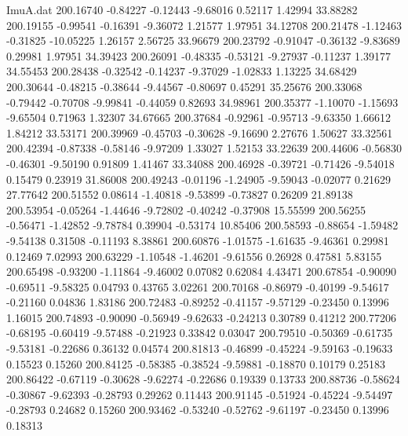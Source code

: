 \begin{filecontents}{ImuA.dat}
 200.16740   -0.84227   -0.12443   -9.68016    0.52117    1.42994   33.88282
 200.19155   -0.99541   -0.16391   -9.36072    1.21577    1.97951   34.12708
 200.21478   -1.12463   -0.31825  -10.05225    1.26157    2.56725   33.96679
 200.23792   -0.91047   -0.36132   -9.83689    0.29981    1.97951   34.39423
 200.26091   -0.48335   -0.53121   -9.27937   -0.11237    1.39177   34.55453
 200.28438   -0.32542   -0.14237   -9.37029   -1.02833    1.13225   34.68429
 200.30644   -0.48215   -0.38644   -9.44567   -0.80697    0.45291   35.25676
 200.33068   -0.79442   -0.70708   -9.99841   -0.44059    0.82693   34.98961
 200.35377   -1.10070   -1.15693   -9.65504    0.71963    1.32307   34.67665
 200.37684   -0.92961   -0.95713   -9.63350    1.66612    1.84212   33.53171
 200.39969   -0.45703   -0.30628   -9.16690    2.27676    1.50627   33.32561
 200.42394   -0.87338   -0.58146   -9.97209    1.33027    1.52153   33.22639
 200.44606   -0.56830   -0.46301   -9.50190    0.91809    1.41467   33.34088
 200.46928   -0.39721   -0.71426   -9.54018    0.15479    0.23919   31.86008
 200.49243   -0.01196   -1.24905   -9.59043   -0.02077    0.21629   27.77642
 200.51552    0.08614   -1.40818   -9.53899   -0.73827    0.26209   21.89138
 200.53954   -0.05264   -1.44646   -9.72802   -0.40242   -0.37908   15.55599
 200.56255   -0.56471   -1.42852   -9.78784    0.39904   -0.53174   10.85406
 200.58593   -0.88654   -1.59482   -9.54138    0.31508   -0.11193    8.38861
 200.60876   -1.01575   -1.61635   -9.46361    0.29981    0.12469    7.02993
 200.63229   -1.10548   -1.46201   -9.61556    0.26928    0.47581    5.83155
 200.65498   -0.93200   -1.11864   -9.46002    0.07082    0.62084    4.43471
 200.67854   -0.90090   -0.69511   -9.58325    0.04793    0.43765    3.02261
 200.70168   -0.86979   -0.40199   -9.54617   -0.21160    0.04836    1.83186
 200.72483   -0.89252   -0.41157   -9.57129   -0.23450    0.13996    1.16015
 200.74893   -0.90090   -0.56949   -9.62633   -0.24213    0.30789    0.41212
 200.77206   -0.68195   -0.60419   -9.57488   -0.21923    0.33842    0.03047
 200.79510   -0.50369   -0.61735   -9.53181   -0.22686    0.36132    0.04574
 200.81813   -0.46899   -0.45224   -9.59163   -0.19633    0.15523    0.15260
 200.84125   -0.58385   -0.38524   -9.59881   -0.18870    0.10179    0.25183
 200.86422   -0.67119   -0.30628   -9.62274   -0.22686    0.19339    0.13733
 200.88736   -0.58624   -0.30867   -9.62393   -0.28793    0.29262    0.11443
 200.91145   -0.51924   -0.45224   -9.54497   -0.28793    0.24682    0.15260
 200.93462   -0.53240   -0.52762   -9.61197   -0.23450    0.13996    0.18313

\end{filecontents}
